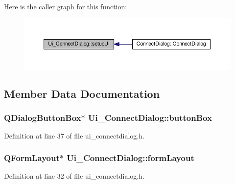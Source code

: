 Here is the caller graph for this function\+:
\nopagebreak
\begin{figure}[H]
\begin{center}
\leavevmode
\includegraphics[width=350pt]{class_ui___connect_dialog_a9176ff19214024ec2e1c4c55a5d3bc4d_icgraph}
\end{center}
\end{figure}




\subsection{Member Data Documentation}
\hypertarget{class_ui___connect_dialog_ab2e3564ced3c77ab8fdaf625e00cabd0}{}
\subsubsection[{button\+Box}]{\setlength{\rightskip}{0pt plus 5cm}Q\+Dialog\+Button\+Box$\ast$ Ui\+\_\+\+Connect\+Dialog\+::button\+Box}\label{class_ui___connect_dialog_ab2e3564ced3c77ab8fdaf625e00cabd0}


Definition at line 37 of file ui\+\_\+connectdialog.\+h.

\hypertarget{class_ui___connect_dialog_a3c558f827a53d25c0fee17452dd88e17}{}
\subsubsection[{form\+Layout}]{\setlength{\rightskip}{0pt plus 5cm}Q\+Form\+Layout$\ast$ Ui\+\_\+\+Connect\+Dialog\+::form\+Layout}\label{class_ui___connect_dialog_a3c558f827a53d25c0fee17452dd88e17}


Definition at line 32 of file ui\+\_\+connectdialog.\+h.

\hypertarget{class_ui___connect_dialog_a2e741e9c70f18503f0ceb91b8e8a3292}{}
